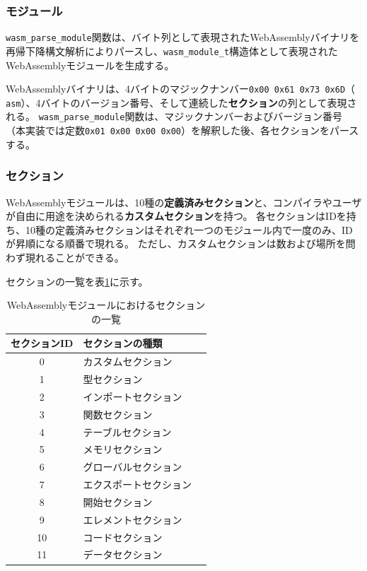 \subsubsection{モジュール}

\verb|wasm_parse_module|関数は、バイト列として表現されたWebAssemblyバイナリを再帰下降構文解析によりパースし、\verb|wasm_module_t|構造体として表現されたWebAssemblyモジュールを生成する。

WebAssemblyバイナリは、4バイトのマジックナンバー{\tt 0x00 0x61 0x73 0x6D}（\verb*| asm|）、4バイトのバージョン番号、そして連続した{\bf セクション}の列として表現される。
\verb|wasm_parse_module|関数は、マジックナンバーおよびバージョン番号（本実装では定数{\tt 0x01 0x00 0x00 0x00}）を解釈した後、各セクションをパースする。

\subsubsection{セクション}

WebAssemblyモジュールは、10種の{\bf 定義済みセクション}と、コンパイラやユーザが自由に用途を決められる{\bf カスタムセクション}を持つ。
各セクションはIDを持ち、10種の定義済みセクションはそれぞれ一つのモジュール内で一度のみ、IDが昇順になる順番で現れる。
ただし、カスタムセクションは数および場所を問わず現れることができる。

セクションの一覧を表\ref{tb:wasm_sections}に示す。

\begin{table}[htbp]
  \begin{center}
    \caption{WebAssemblyモジュールにおけるセクションの一覧}
    \label{tb:wasm_sections}
    \begin{tabular}{|c|l|l|}
      \hline
      セクションID & セクションの種類 \\\hline\hline
      0 & カスタムセクション \\\hline
      1 & 型セクション \\\hline
      2 & インポートセクション \\\hline
      3 & 関数セクション \\\hline
      4 & テーブルセクション \\\hline
      5 & メモリセクション \\\hline
      6 & グローバルセクション \\\hline
      7 & エクスポートセクション \\\hline
      8 & 開始セクション \\\hline
      9 & エレメントセクション \\\hline
      10 & コードセクション \\\hline
      11 & データセクション \\\hline
    \end{tabular}
  \end{center}
\end{table}

